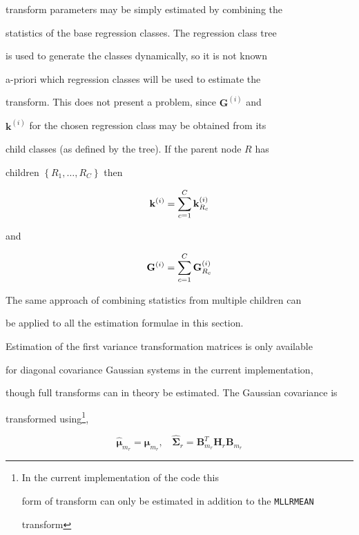 transform parameters may be simply estimated by combining the


statistics of the base regression classes.  The regression class tree


is used to generate the classes dynamically, so it is not known


a-priori which regression classes will be used to estimate the


transform. This does not present a problem, since $\bm{G}^{(i)}$ and


$\bm{k}^{(i)}$ for the chosen regression class may be obtained from its


child classes (as defined by the tree). If the parent node $R$ has


children $\left\{R_1,\dots,R_C\right\}$ then


\[


        {\bf k}^{(i)} = \sum_{c=1}^{C} {\bf k}^{(i)}_{R_c}


\]


and


\[


        {\bf G}^{(i)} = \sum_{c=1}^{C} {\bf G}^{(i)}_{R_c}


\]


The same approach of combining statistics from multiple children can


be applied to all the estimation formulae in this section.










Estimation of the first variance transformation matrices is only available


for diagonal covariance Gaussian systems in the current implementation,


though full transforms can in theory be estimated. The Gaussian covariance is


transformed using\footnote{In the current implementation of the code this


form of transform can only be estimated in addition to the {\tt MLLRMEAN} 


transform},


\[


        \hat{\bm{\mu}}_{m_r} = \bm{\mu}_{m_r}, \:\:\:\: 


        \hat{\bm{\Sigma}}_{r} = \bm{B}_{m_r}^T\bm{H}_r\bm{B}_{m_r}


\]


